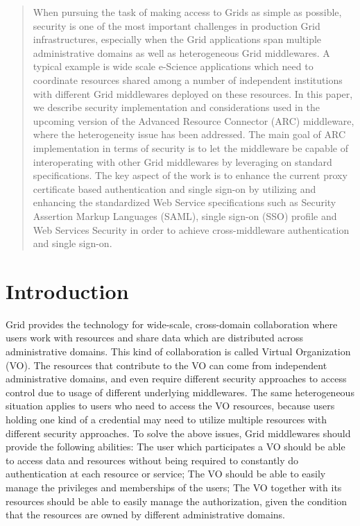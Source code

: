 \date{Received: date / Accepted: date}


\maketitle

\begin{abstract}
When pursuing the task of making access to Grids as simple as possible, security is one of the most important challenges in production Grid infrastructures, especially when the Grid applications span multiple administrative domains as well as heterogeneous Grid middlewares. A typical example is wide scale e-Science applications which need to coordinate resources shared among a number of independent institutions with different Grid middlewares deployed on these resources. In this paper, we describe security implementation and considerations used in the upcoming version of the Advanced Resource Connector (ARC) middleware, where the heterogeneity issue has been addressed. The main goal of ARC implementation in terms of security is to let the middleware be capable of interoperating with other Grid middlewares by leveraging on standard specifications. The key aspect of the work is to enhance the current proxy certificate based authentication and single sign-on by utilizing and enhancing the standardized Web Service specifications such as Security Assertion Markup Languages (SAML), single sign-on (SSO) profile and Web Services Security in order to achieve cross-middleware authentication and single sign-on.
\end{abstract}

\section{Introduction} 
\label{sec:intro}
Grid provides the technology for wide-scale, cross-domain collaboration where users work with resources and share data which are distributed across administrative domains. This kind of collaboration is called Virtual Organization (VO)\cite{IFoster01}. The resources that contribute to the VO can come from independent administrative domains, and even require different security approaches to access control due to usage of different underlying middlewares. The same heterogeneous situation applies to users who need to access the VO resources, because users holding one kind of a credential may need to utilize multiple resources with different security approaches. To solve the above issues, Grid middlewares should provide the following abilities:
The user which participates a VO should be able to access data and resources without being required to constantly do authentication at each resource or service;
The VO should be able to easily manage the privileges and memberships of the users;
The VO together with its resources should be able to easily manage the authorization, given the condition that the resources are owned by different administrative domains.

